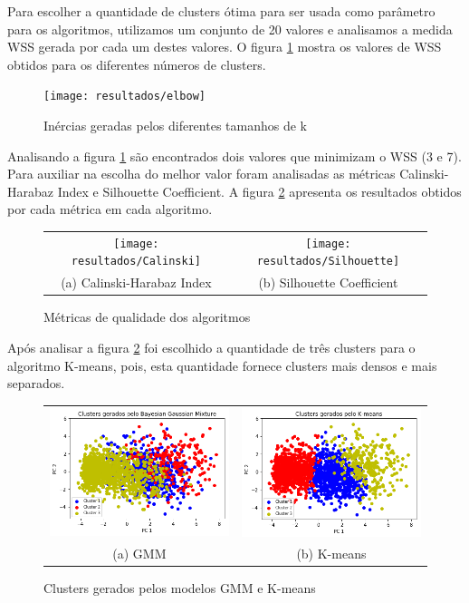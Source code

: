 \documentclass{article}
\begin{document}
Para escolher a quantidade de clusters ótima para ser usada como parâmetro para os algoritmos, utilizamos um conjunto de 20 valores e analisamos a medida WSS gerada por cada um destes valores. O figura \ref{elbow} mostra os valores de WSS obtidos para os diferentes números de clusters.

\begin{figure}[H]
\centering
    \texttt{[image: resultados/elbow]}
\caption{Inércias geradas pelos diferentes tamanhos de k}
\label{elbow}
\end{figure}

Analisando a figura \ref{elbow} são encontrados dois valores que minimizam o WSS (3 e 7). Para auxiliar na escolha do melhor valor foram analisadas as métricas Calinski-Harabaz Index e Silhouette Coefficient. A figura \ref{metricas} apresenta os resultados obtidos por cada métrica em cada algoritmo.

\begin{figure}[H]
\begin{tabular}{cc}
    \texttt{[image: resultados/Calinski]} & \texttt{[image: resultados/Silhouette]}\\
    (a) Calinski-Harabaz Index & (b) Silhouette Coefficient \\[6pt]
\end{tabular}
\caption{Métricas de qualidade dos algoritmos}
\label{metricas}
\end{figure}

Após analisar a figura \ref{metricas} foi escolhido a quantidade de três clusters para o algoritmo K-means, pois, esta quantidade fornece clusters mais densos e mais separados.
 
\begin{figure}[H]
\begin{tabular}{cc}
    \includegraphics[width=65mm]{resultados/clusters_gmm} & \includegraphics[width=65mm]{resultados/clusters_kmeans}\\
    (a) GMM & (b) K-means \\[6pt]
\end{tabular}
\caption{Clusters gerados pelos modelos GMM e K-means}
\label{clusters}
\end{figure}
\end{document}
